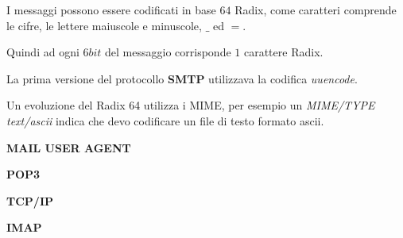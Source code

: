 I messaggi possono essere codificati in base $64$ Radix, come caratteri
comprende le cifre, le lettere maiuscole e minuscole, $\_$ ed $=$.

Quindi ad ogni $6bit$ del messaggio corrisponde $1$ carattere Radix.

La prima versione del protocollo \textbf{SMTP} utilizzava la codifica \emph{
uuencode}.


Un evoluzione del Radix 64 utilizza i MIME, per esempio un \emph{MIME/TYPE}
\emph{text/ascii} indica che devo codificare un file di testo formato ascii.

\textbf{MAIL USER AGENT}

\textbf{POP3}

\textbf{TCP/IP}

\textbf{IMAP}
